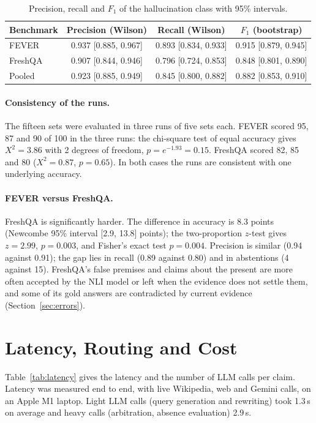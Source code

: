 \begin{table}[H]
\centering
\caption{Precision, recall and $F_1$ of the hallucination class with 95\% intervals.}
\label{tab:prf}
\begin{tabular}{@{}lccc@{}}
\toprule
Benchmark & Precision (Wilson) & Recall (Wilson) & $F_1$ (bootstrap) \\
\midrule
FEVER & 0.937 [0.885, 0.967] & 0.893 [0.834, 0.933] & 0.915 [0.879, 0.945] \\
FreshQA & 0.907 [0.844, 0.946] & 0.796 [0.724, 0.853] & 0.848 [0.801, 0.890] \\
Pooled & 0.923 [0.885, 0.949] & 0.845 [0.800, 0.882] & 0.882 [0.853, 0.910] \\
\bottomrule
\end{tabular}
\end{table}

\paragraph{Consistency of the runs.} The fifteen sets were evaluated in three runs of five sets each. FEVER scored 95, 87 and 90 of 100 in the three runs: the chi-square test of equal accuracy gives $X^2 = 3.86$ with 2 degrees of freedom, $p = e^{-1.93} = 0.15$. FreshQA scored 82, 85 and 80 ($X^2 = 0.87$, $p = 0.65$). In both cases the runs are consistent with one underlying accuracy.

\paragraph{FEVER versus FreshQA.} FreshQA is significantly harder. The difference in accuracy is 8.3 points (Newcombe 95\% interval [2.9, 13.8] points); the two-proportion $z$-test gives $z = 2.99$, $p = 0.003$, and Fisher's exact test $p = 0.004$. Precision is similar (0.94 against 0.91); the gap lies in recall (0.89 against 0.80) and in abstentions (4 against 15). FreshQA's false premises and claims about the present are more often accepted by the NLI model or left \Unk{} when the evidence does not settle them, and some of its gold answers are contradicted by current evidence (Section~\ref{sec:errors}).

\section{Latency, Routing and Cost}
\label{sec:routing-results}

Table~\ref{tab:latency} gives the latency and the number of LLM calls per claim. Latency was measured end to end, with live Wikipedia, web and Gemini calls, on an Apple M1 laptop. Light LLM calls (query generation and rewriting) took 1.3\,s on average and heavy calls (arbitration, absence evaluation) 2.9\,s.

